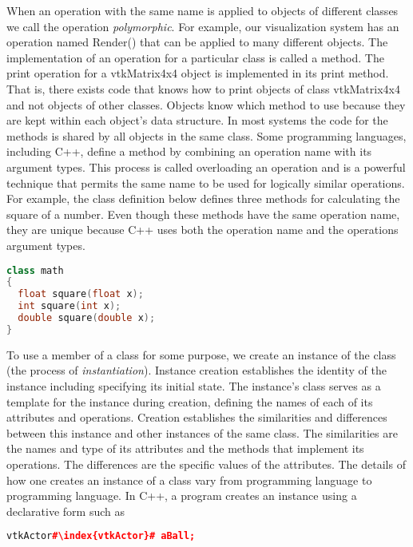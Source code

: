 When an operation with the same name is applied to objects of different classes we call the operation \emph{polymorphic}. For example, our visualization system has an operation named Render() that can be applied to many different objects. The implementation of an operation for a particular class is called a method. The print operation for a vtkMatrix4x4 object is implemented in its print method. That is, there exists code that knows how to print objects of class vtkMatrix4x4 and not objects of other classes. Objects know which method to use because they are kept within each object's data structure. In most systems the code for the methods is shared by all objects in the same class. Some programming languages, including C++, define a method by combining an operation name with its argument types. This process is called overloading an operation and is a powerful technique that permits the same name to be used for logically similar operations. For example, the class definition below defines three methods for calculating the square of a number. Even though these methods have the same operation name, they are unique because C++ uses both the operation name and the operations argument types.

\begin{lstlisting}[language=C++, caption={math class.}]
class math
{
  float square(float x);
  int square(int x);
  double square(double x);
}
\end{lstlisting}

To use a member of a class for some purpose, we create an instance of the class (the process of \emph{instantiation}). Instance creation establishes the identity of the instance including specifying its initial state. The instance's class serves as a template for the instance during creation, defining the names of each of its attributes and operations. Creation establishes the similarities and differences between this instance and other instances of the same class. The similarities are the names and type of its attributes and the methods that implement its operations. The differences are the specific values of the attributes. The details of how one creates an instance of a class vary from programming language to programming language. In C++, a program creates an instance using a declarative form such as

\begin{lstlisting}[language=C++,  caption={}, numbers=none, frame=none, escapechar=\#]
vtkActor#\index{vtkActor}# aBall;
\end{lstlisting}

